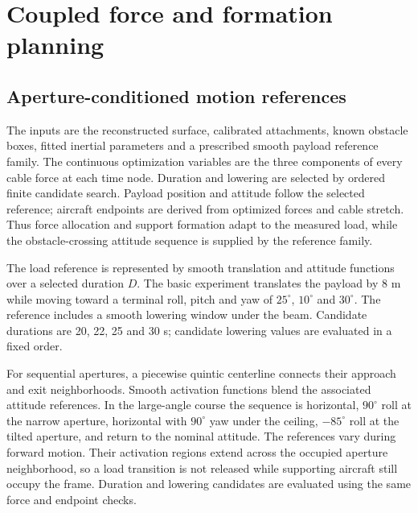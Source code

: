 \section{Coupled force and formation planning}
\subsection{Aperture-conditioned motion references}
The inputs are the reconstructed surface, calibrated attachments, known obstacle boxes, fitted inertial parameters and a prescribed smooth payload reference family. The continuous optimization variables are the three components of every cable force at each time node. Duration and lowering are selected by ordered finite candidate search. Payload position and attitude follow the selected reference; aircraft endpoints are derived from optimized forces and cable stretch. Thus force allocation and support formation adapt to the measured load, while the obstacle-crossing attitude sequence is supplied by the reference family.

The load reference is represented by smooth translation and attitude functions over a selected duration $D$. The basic experiment translates the payload by 8 m while moving toward a terminal roll, pitch and yaw of $25^\circ$, $10^\circ$ and $30^\circ$. The reference includes a smooth lowering window under the beam. Candidate durations are 20, 22, 25 and 30 s; candidate lowering values are evaluated in a fixed order.

For sequential apertures, a piecewise quintic centerline connects their approach and exit neighborhoods. Smooth activation functions blend the associated attitude references. In the large-angle course the sequence is horizontal, $90^\circ$ roll at the narrow aperture, horizontal with $90^\circ$ yaw under the ceiling, $-85^\circ$ roll at the tilted aperture, and return to the nominal attitude. The references vary during forward motion. Their activation regions extend across the occupied aperture neighborhood, so a load transition is not released while supporting aircraft still occupy the frame. Duration and lowering candidates are evaluated using the same force and endpoint checks.

